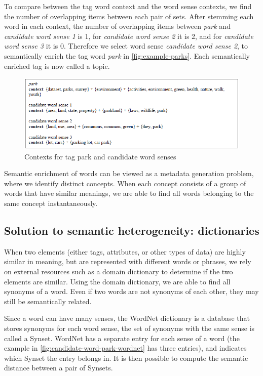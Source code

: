 To compare between the tag word context and the word sense contexts, we find the number of overlapping items between each pair of sets. After stemming each word in each context, the number of overlapping items between \textit{park} and \textit{candidate word sense 1} is 1, for \textit{candidate word sense 2} it is 2, and for \textit{candidate word sense 3} it is 0. Therefore we select word sense \textit{candidate word sense 2}, to semantically enrich the tag word \textit{park} in \autoref{fig:example-parks}. Each semantically enriched tag is now called a topic.

\begin{figure}
    \centering
    \includegraphics[width=5in]{figures/contexts-park-candidate.png}
    \caption{Contexts for tag park and candidate word senses}
    \label{fig:contexts-park-candidate}
\end{figure}

Semantic enrichment of words can be viewed as a metadata generation problem, where we identify distinct concepts. When each concept consists of a group of words that have similar meanings, we are able to find all words belonging to the same concept instantaneously.

\subsection{Solution to semantic heterogeneity: dictionaries}
\label{ssec:SolutionToSemanticHeterogeneityDdictionaries}

When two elements (either tags, attributes, or other types of data) are highly similar in meaning, but are represented with different words or phrases, we rely on external resources such as a domain dictionary to determine if the two elements are similar. Using the domain dictionary, we are able to find all synonyms of a word. Even if two words are not synonyms of each other, they may still be semantically related.

Since a word can have many senses, the WordNet dictionary is a database that stores synonyms for each word sense, the set of synonyms with the same sense is called a Synset. WordNet has a separate entry for each sense of a word (the example in \autoref{fig:candidate-word-park-wordnet} has three entries), and indicates which Synset the entry belongs in. It is then possible to compute the semantic distance between a pair of Synsets.


